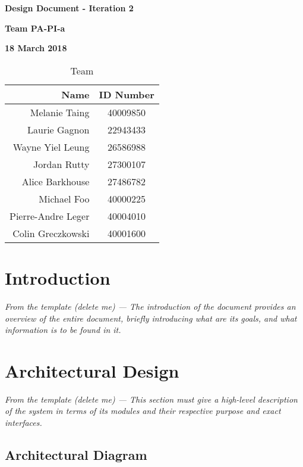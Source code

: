 \documentclass[12pt]{article}
\begin{document}
\vspace*{0.5in}
\centerline{\bf\Large Design Document - Iteration 2}

\vspace*{0.5in}
\centerline{\bf\Large Team PA-PI-a}

\vspace*{0.5in}
\centerline{\bf\Large 18 March 2018}

\vspace*{1.5in}
\begin{table}[htbp]
\caption{Team}
\begin{center}
\begin{tabular}{|r | c|}
\hline
Name & ID Number \\
\hline\hline
Melanie Taing & 40009850 \\
Laurie Gagnon & 22943433 \\
Wayne Yiel Leung & 26586988 \\
Jordan Rutty & 27300107 \\
Alice Barkhouse & 27486782 \\
Michael Foo & 40000225 \\
Pierre-Andre Leger & 40004010 \\
Colin Greczkowski & 40001600 \\
\hline
\end{tabular}
\end{center}
\end{table}

\clearpage

\tableofcontents

\clearpage

\section{Introduction}
\textit {From the template (delete me) --- The introduction of the document provides an overview of the entire document, briefly introducing what are its goals, and what information is to be found in it.}

\section{Architectural Design} \label{sec:arch}

\textit {From the template (delete me) --- This section must give a high-level description of the system in terms of its modules and their respective purpose and exact interfaces.}

\subsection{Architectural Diagram}
\end{document}
